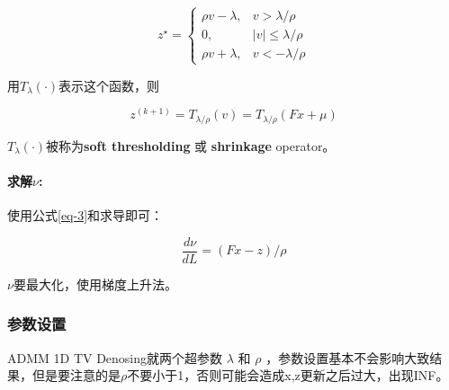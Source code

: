 \documentclass[10pt]{article}
\begin{document}
\begin{equation}
z^{\star}=\left\{\begin{array}{ll}
\rho v-\lambda, & v>\lambda/\rho \\
0, & |v| \leq \lambda/\rho \\
\rho v+\lambda, & v<-\lambda/\rho
\end{array}\right.
\end{equation}

用$T_\lambda(\cdot)$表示这个函数，则

\begin{equation}
	z^{(k+1)} = T_{\lambda/\rho}(v) = T_{\lambda/\rho}(Fx+\mu)
\end{equation}

$T_\lambda(\cdot)$被称为\textbf{soft thresholding} 或 \textbf{shrinkage} operator。

\paragraph{求解$\nu$: } 使用公式\ref{eq-3}和求导即可：

\begin{equation}
\frac{d\nu}{dL} = (Fx-z)/\rho
\end{equation}

$\nu$要最大化，使用梯度上升法。

\subsubsection{参数设置}

ADMM 1D TV Denosing就两个超参数 $\lambda$ 和 $\rho$ ，参数设置基本不会影响大致结果，但是要注意的是$\rho$不要小于1，否则可能会造成x,z更新之后过大，出现INF。

\printbibliography
\end{document}
